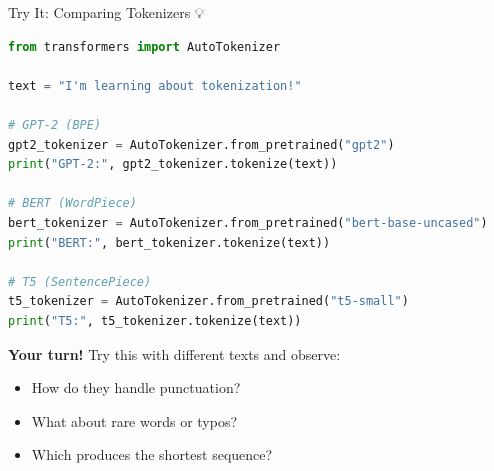 \documentclass[aspectratio=169]{beamer}
\begin{document}
\begin{frame}[fragile]{Try It: Comparing Tokenizers 💡}
    \begin{lstlisting}[language=Python]
from transformers import AutoTokenizer

text = "I'm learning about tokenization!"

# GPT-2 (BPE)
gpt2_tokenizer = AutoTokenizer.from_pretrained("gpt2")
print("GPT-2:", gpt2_tokenizer.tokenize(text))

# BERT (WordPiece)
bert_tokenizer = AutoTokenizer.from_pretrained("bert-base-uncased")
print("BERT:", bert_tokenizer.tokenize(text))

# T5 (SentencePiece)
t5_tokenizer = AutoTokenizer.from_pretrained("t5-small")
print("T5:", t5_tokenizer.tokenize(text))
    \end{lstlisting}

    \vspace{0.5em}
    \textbf{Your turn!} Try this with different texts and observe:
    \begin{itemize}\setlength{\itemsep}{0pt}
        \item How do they handle punctuation?
        \item What about rare words or typos?
        \item Which produces the shortest sequence?
    \end{itemize}
\end{frame}
\end{document}
